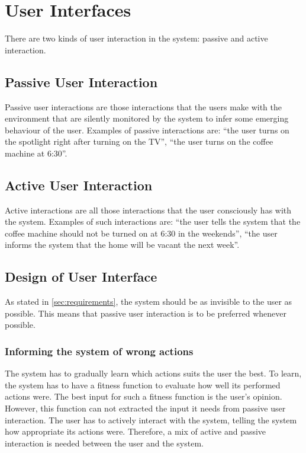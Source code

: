 \section{User Interfaces}
There are two kinds of user interaction in the system: passive and active interaction.

\subsection{Passive User Interaction}
Passive user interactions are those interactions that the users make with the environment that are silently monitored by the system to infer some emerging behaviour of the user. Examples of passive interactions are: \enquote{the user turns on the spotlight right after turning on the TV}, \enquote{the user turns on the coffee machine at 6:30}.

\subsection{Active User Interaction}
Active interactions are all those interactions that the user consciously has with the system. Examples of such interactions are: \enquote{the user tells the system that the coffee machine should not be turned on at 6:30 in the weekends}, \enquote{the user informs the system that the home will be vacant the next week}.

\subsection{Design of User Interface}
As stated in \cref{sec:requirements}, the system should be as invisible to the user as possible. This means that passive user interaction is to be preferred whenever possible. 

\subsubsection{Informing the system of wrong actions}

The system has to gradually learn which actions suits the user the best. To learn, the system has to have a fitness function to evaluate how well its performed actions were. The best input for such a fitness function is the user's opinion. However, this function can not extracted the input it needs from passive user interaction. The user has to actively interact with the system, telling the system how appropriate its actions were. Therefore, a mix of active and passive interaction is needed between the user and the system.

